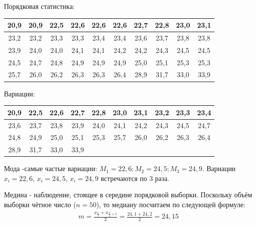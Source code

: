 \documentclass[utf8, a4paper, 14pt, russian, oneside]{book}
\begin{document}
Порядковая статистика:
\begin{table}[h!]
    \centering
    \begin{tabular}{|c|c|c|c|c|c|c|c|c|c|}
        \hline
        20,9 & 20,9 & 22,5 & 22,6 & 22,6 & 22,6 & 22,7 & 22,8 & 23,0 & 23,1\\
        \hline
        23,2 & 23,2 & 23,3 & 23,3 & 23,4 & 23,4 & 23,6 & 23,7 & 23,8 & 23,8\\
        \hline
        23,9 & 24,0 & 24,0 & 24,1 & 24,1 & 24,2 & 24,2 & 24,3 & 24,5 & 24,5\\
        \hline
        24,5 & 24,7 & 24,8 & 24,9 & 24,9 & 24,9 & 25,0 & 25,1 & 25,3 & 25,3\\
        \hline
        25,7 & 26,0 & 26,2 & 26,3 & 26,3 & 26,4 & 28,9 & 31,7 & 33,0 & 33,9\\
        \hline
    \end{tabular}
\end{table}

Вариации:
\begin{table}[h!]
    \centering
    \begin{tabular}{|c|c|c|c|c|c|c|c|c|c|}
        \hline
        20,9 & 22,5 & 22,6 & 22,7 & 22,8 & 23,0 & 23,1 & 23,2 & 23,3 & 23,4\\
        \hline
        23,6 & 23,7 & 23,8 & 23,9 & 24,0 & 24,1 & 24,2 & 24,3 & 24,5 & 24,7\\
        \hline
        24,8 & 24,9 & 25,0 & 25,1 & 25,3 & 25,7 & 26,0 & 26,2 & 26,3 & 26,4\\
        \hline
        28,9 & 31,7 & 33,0 & 33,9 & & & & & &\\
        \hline
    \end{tabular}
\end{table}

Мода -самые частые вариации: $M_1 = 22,6; M_2 = 24,5; M_3 = 24,9$. Вариации $x_i = 22,6$, $x_i=24,5$, $x_i = 24,9$ встречаются по 3 раза.

Медина - наблюдение, стоящее в середине порядковой выборки. Поскольку объём выборки чётное число ($n=50$), то медиану посчитаем по следующей формуле:
\begin{align*}
    m = \frac{x_{\tfrac{n}{2}} + x_{\tfrac{n}{2} + 1}}{2} = \frac{24,1 + 24,2}{2} = 24,15
\end{align*}
\end{document}
